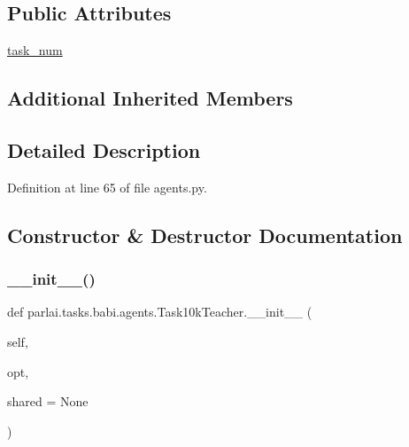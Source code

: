 \subsection*{Public Attributes}
\begin{DoxyCompactItemize}
\item 
\hyperlink{classparlai_1_1tasks_1_1babi_1_1agents_1_1Task10kTeacher_a71c66ccc1c27b22f0e49863c0926d59c}{task\+\_\+num}
\end{DoxyCompactItemize}
\subsection*{Additional Inherited Members}


\subsection{Detailed Description}


Definition at line 65 of file agents.\+py.



\subsection{Constructor \& Destructor Documentation}
\mbox{\label{classparlai_1_1tasks_1_1babi_1_1agents_1_1Task10kTeacher_a2a37e51cf3bf8c1248b60a211aaa4081}} 
\subsubsection{\texorpdfstring{\+\_\+\+\_\+init\+\_\+\+\_\+()}{\_\_init\_\_()}}
{\footnotesize\ttfamily def parlai.\+tasks.\+babi.\+agents.\+Task10k\+Teacher.\+\_\+\+\_\+init\+\_\+\+\_\+ (\begin{DoxyParamCaption}\item[{}]{self,  }\item[{}]{opt,  }\item[{}]{shared = {\ttfamily None} }\end{DoxyParamCaption})}



